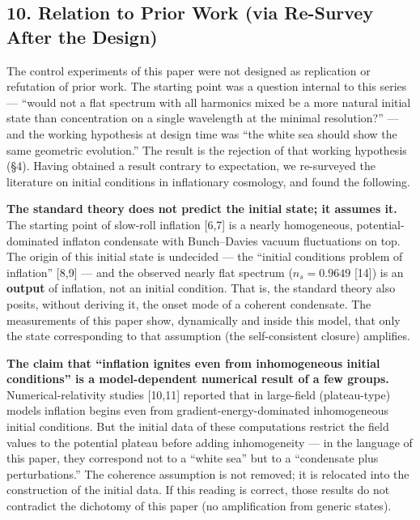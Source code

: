 \documentclass[
  a4paper,
]{article}
\begin{document}
\subsection{10. Relation to Prior Work (via Re-Survey After the
Design)}\label{relation-to-prior-work-via-re-survey-after-the-design}

The control experiments of this paper were not designed as replication
or refutation of prior work. The starting point was a question internal
to this series --- ``would not a flat spectrum with all harmonics mixed
be a more natural initial state than concentration on a single
wavelength at the minimal resolution?'' --- and the working hypothesis
at design time was ``the white sea should show the same geometric
evolution.'' The result is the rejection of that working hypothesis
(§4). Having obtained a result contrary to expectation, we re-surveyed
the literature on initial conditions in inflationary cosmology, and
found the following.

\textbf{The standard theory does not predict the initial state; it
assumes it.} The starting point of slow-roll inflation {[}6,7{]} is a
nearly homogeneous, potential-dominated inflaton condensate with
Bunch--Davies vacuum fluctuations on top. The origin of this initial
state is undecided --- the ``initial conditions problem of inflation''
{[}8,9{]} --- and the observed nearly flat spectrum (\(n_s=0.9649\)
{[}14{]}) is an \textbf{output} of inflation, not an initial condition.
That is, the standard theory also posits, without deriving it, the onset
mode of a coherent condensate. The measurements of this paper show,
dynamically and inside this model, that only the state corresponding to
that assumption (the self-consistent closure) amplifies.

\textbf{The claim that ``inflation ignites even from inhomogeneous
initial conditions'' is a model-dependent numerical result of a few
groups.} Numerical-relativity studies {[}10,11{]} reported that in
large-field (plateau-type) models inflation begins even from
gradient-energy-dominated inhomogeneous initial conditions. But the
initial data of these computations restrict the field values to the
potential plateau before adding inhomogeneity --- in the language of
this paper, they correspond not to a ``white sea'' but to a ``condensate
plus perturbations.'' The coherence assumption is not removed; it is
relocated into the construction of the initial data. If this reading is
correct, those results do not contradict the dichotomy of this paper (no
amplification from generic states).
\end{document}

